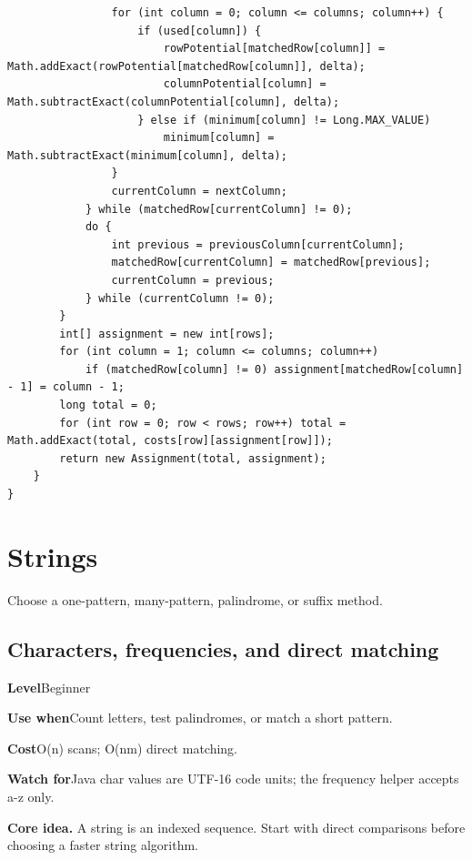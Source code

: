 \documentclass[10pt,letterpaper]{article}
\newcommand{\entrylabel}[1]{\textcolor{accent}{\bfseries #1}}
\begin{document}
\begin{lstlisting}
                for (int column = 0; column <= columns; column++) {
                    if (used[column]) {
                        rowPotential[matchedRow[column]] = Math.addExact(rowPotential[matchedRow[column]], delta);
                        columnPotential[column] = Math.subtractExact(columnPotential[column], delta);
                    } else if (minimum[column] != Long.MAX_VALUE)
                        minimum[column] = Math.subtractExact(minimum[column], delta);
                }
                currentColumn = nextColumn;
            } while (matchedRow[currentColumn] != 0);
            do {
                int previous = previousColumn[currentColumn];
                matchedRow[currentColumn] = matchedRow[previous];
                currentColumn = previous;
            } while (currentColumn != 0);
        }
        int[] assignment = new int[rows];
        for (int column = 1; column <= columns; column++)
            if (matchedRow[column] != 0) assignment[matchedRow[column] - 1] = column - 1;
        long total = 0;
        for (int row = 0; row < rows; row++) total = Math.addExact(total, costs[row][assignment[row]]);
        return new Assignment(total, assignment);
    }
}
\end{lstlisting}
\section{Strings}
\begin{guidebox}Choose a one-pattern, many-pattern, palindrome, or suffix method.\end{guidebox}
\subsection{Characters, frequencies, and direct matching}
\begin{guidebox}\small
\entrylabel{Level}\quad Beginner\par
\entrylabel{Use when}\quad Count letters, test palindromes, or match a short pattern.\par
\entrylabel{Cost}\quad O(n) scans; O(nm) direct matching.\par
\entrylabel{Watch for}\quad Java char values are UTF-16 code units; the frequency helper accepts a-z only.\par
\end{guidebox}
\noindent\textbf{Core idea.} A string is an indexed sequence. Start with direct comparisons before choosing a faster string algorithm.\par
\end{document}
